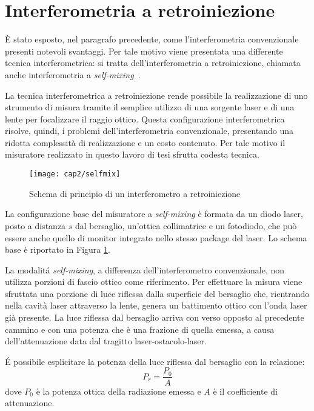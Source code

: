 \section{Interferometria a retroiniezione}
È stato esposto, nel paragrafo precedente, come l'interferometria convenzionale presenti notevoli svantaggi. Per tale motivo viene presentata una differente tecnica interferometrica: si tratta dell'interferometria a retroiniezione, chiamata anche interferometria a \textit{self-mixing}~\cite{1464-4258-4-6-371}.

La tecnica interferometrica a retroiniezione rende possibile la realizzazione di uno strumento di misura tramite il semplice utilizzo di una sorgente laser e di una lente per focalizzare il raggio ottico. Questa configurazione interferometrica risolve, quindi, i problemi dell'interferometria convenzionale, presentando una ridotta complessità di realizzazione e un costo contenuto. Per tale motivo il misuratore realizzato in questo lavoro di tesi sfrutta codesta tecnica.

\begin{figure}  
  \begin{center}
    \texttt{[image: cap2/selfmix]}
    \caption{Schema di principio di un interferometro a retroiniezione}
    \label{selfmix}
  \end{center}
\end{figure}

La configurazione base del misuratore a \textit{self-mixing} è formata da un diodo laser, posto a distanza $s$ dal bersaglio, un'ottica collimatrice e un fotodiodo, che può essere anche quello di monitor integrato nello stesso package del laser. Lo schema base è riportato in Figura \ref{selfmix}.

La modalitá \textit{self-mixing}, a differenza dell'interferometro convenzionale, non utilizza porzioni di fascio ottico come riferimento. Per effettuare la misura viene sfruttata una porzione di luce riflessa dalla superficie del bersaglio che, rientrando nella cavità laser attraverso la lente, genera un battimento ottico con l'onda laser già presente. La luce riflessa dal bersaglio arriva con verso opposto al precedente cammino e con una potenza che è una frazione di quella emessa, a causa dell'attenuazione data dal tragitto laser-ostacolo-laser.

\'E possibile esplicitare la potenza della luce riflessa dal bersaglio con la relazione:
\begin{equation}
	P_r=\frac{P_0}{A}
\end{equation}
dove $P_0$ è la potenza ottica della radiazione emessa e $A$ è il coefficiente di attenuazione.

